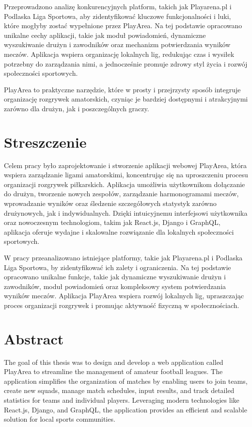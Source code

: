 \documentclass[wmii,inf,inz]{uwmthesis} %
\begin{document}
Przeprowadzono analizę konkurencyjnych platform, takich jak Playarena.pl i Podlaska Liga Sportowa, aby zidentyfikować kluczowe funkcjonalności i luki, które mogłyby zostać wypełnione przez PlayArea. Na tej podstawie opracowano unikalne cechy aplikacji, takie jak moduł powiadomień, dynamiczne wyszukiwanie drużyn i zawodników oraz mechanizm potwierdzania wyników meczów. Aplikacja wspiera organizację lokalnych lig, redukując czas i wysiłek potrzebny do zarządzania nimi, a jednocześnie promuje zdrowy styl życia i rozwój społeczności sportowych.

PlayArea to praktyczne narzędzie, które w prosty i przejrzysty sposób integruje organizację rozgrywek amatorskich, czyniąc je bardziej dostępnymi i atrakcyjnymi zarówno dla drużyn, jak i poszczególnych graczy.

\chapter*{Streszczenie}

Celem pracy było zaprojektowanie i stworzenie aplikacji webowej PlayArea, która wspiera zarządzanie ligami amatorskimi, koncentrując się na uproszczeniu procesu organizacji rozgrywek piłkarskich. Aplikacja umożliwia użytkownikom dołączanie do drużyn, tworzenie nowych zespołów, zarządzanie harmonogramami meczów, wprowadzanie wyników oraz śledzenie szczegółowych statystyk zarówno drużynowych, jak i indywidualnych. Dzięki intuicyjnemu interfejsowi użytkownika oraz nowoczesnym technologiom, takim jak React.js, Django i GraphQL, aplikacja oferuje wydajne i skalowalne rozwiązanie dla lokalnych społeczności sportowych.

W pracy przeanalizowano istniejące platformy, takie jak Playarena.pl i Podlaska Liga Sportowa, by zidentyfikować ich zalety i ograniczenia. Na tej podstawie opracowano unikalne funkcje, takie jak dynamiczne wyszukiwanie drużyn i zawodników, moduł powiadomień oraz kompleksowy system potwierdzania wyników meczów. Aplikacja PlayArea wspiera rozwój lokalnych lig, upraszczając proces organizacji rozgrywek i promując aktywność fizyczną w społecznościach.

\chapter*{Abstract}

The goal of this thesis was to design and develop a web application called PlayArea to streamline the management of amateur football leagues. The application simplifies the organization of matches by enabling users to join teams, create new squads, manage match schedules, input results, and track detailed statistics for teams and individual players. Leveraging modern technologies like React.js, Django, and GraphQL, the application provides an efficient and scalable solution for local sports communities.
\end{document}
